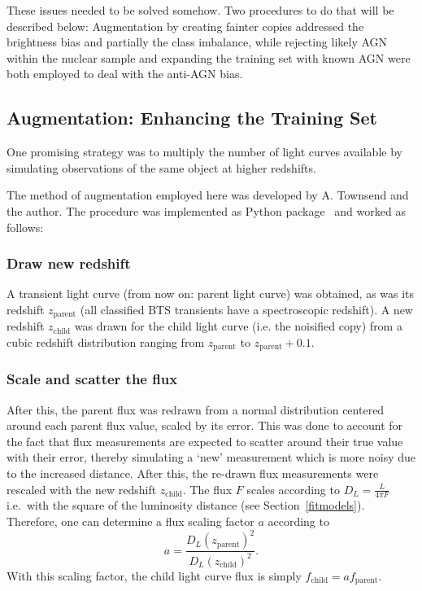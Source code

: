 These issues needed to be solved somehow. Two procedures to do that will be described below: Augmentation by creating fainter copies addressed the brightness bias and partially the class imbalance, while rejecting likely AGN within the nuclear sample and expanding the training set with known AGN were both employed to deal with the anti-AGN bias.

\subsection{Augmentation: Enhancing the Training Set}\label{noisification}
One promising strategy was to multiply the number of light curves available by simulating observations of the same object at higher redshifts.

The method of augmentation employed here was developed by A. Townsend and the author. The procedure was implemented as Python package~ and worked as follows:

\subsubsection{Draw new redshift}
A transient light curve (from now on: parent light curve) was obtained, as was its redshift $z_\text{parent}$ (all classified BTS transients have a spectroscopic redshift). A new redshift $z_\text{child}$ was drawn for the child light curve (i.e. the noisified copy) from a cubic redshift distribution ranging from $z­_\text{parent}$ to $z_\text{parent}+0.1$.

\subsubsection{Scale and scatter the flux}
After this, the parent flux was redrawn from a normal distribution centered around each parent flux value, scaled by its error. This was done to account for the fact that flux measurements are expected to scatter around their true value with their error, thereby simulating a `new' measurement which is more noisy due to the increased distance. After this, the re-drawn flux measurements were rescaled with the new redshift $z_\text{child}$. The flux $F$ scales according to $D_L=\frac{L}{4 \pi F}$ i.e.~with the square of the luminosity distance (see Section~\ref{fitmodels}). Therefore, one can determine a flux scaling factor $a$ according to
\begin{equation}
  a = \frac{D_L(z_\text{parent})^2}{D_L(z_\text{child})^2}.
\end{equation}
With this scaling factor, the child light curve flux is simply $f_\text{child} = a f_\text{parent}$.

